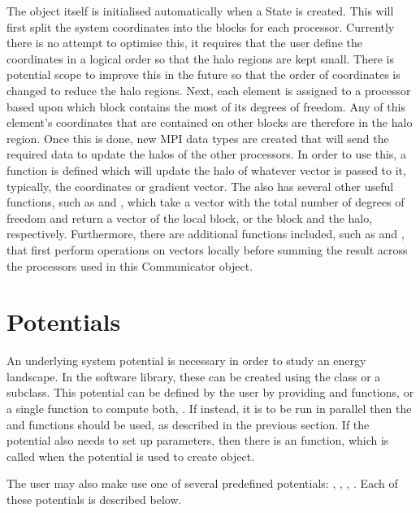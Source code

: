 The  object itself is initialised automatically when a State is created.
This will first split the system coordinates into the blocks for each processor.
Currently there is no attempt to optimise this, it requires that the user define the coordinates in a logical order so that the halo regions are kept small.
There is potential scope to improve this in the future so that the order of coordinates is changed to reduce the halo regions.
Next, each element is assigned to a processor based upon which block contains the most of its degrees of freedom.
Any of this element's coordinates that are contained on other blocks are therefore in the halo region.
Once this is done, new MPI data types are created that will send the required data to update the halos of the other processors.
In order to use this, a  function is defined which will update the halo of whatever vector is passed to it, typically, the coordinates or gradient vector.
The  also has several other useful functions, such as  and , which take a vector with the total number of degrees of freedom and return a vector of the local block, or the block and the halo, respectively.
Furthermore, there are additional functions included, such as  and , that first perform operations on vectors locally before summing the result across the processors used in this Communicator object.



\section{Potentials}\label{sec:ell-potentials}
An underlying system potential is necessary in order to study an energy landscape.
In the software library, these can be created using the  class or a subclass.
This potential can be defined by the user by providing  and  functions, or a single function to compute both, .
If instead, it is to be run in parallel then the  and  functions should be used, as described in the previous section.
If the potential also needs to set up parameters, then there is an  function, which is called when the potential is used to create  object.

The user may also make use one of several predefined potentials: , , , . Each of these potentials is described below.


